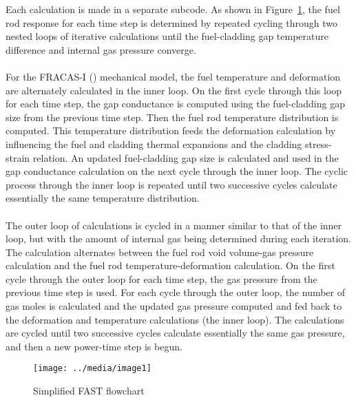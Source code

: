 Each calculation is made in a separate subcode. As shown in Figure~\ref{fig:fast-flowchart}, the
fuel rod response for each time step is determined by repeated cycling through two nested loops of
iterative calculations until the fuel-cladding gap temperature difference and internal gas pressure
converge.
\\
\\
For the FRACAS-I (\cite{ref:Bohn1977}) mechanical model, the fuel temperature and
deformation are alternately calculated in the inner loop. On the first cycle through this loop for
each time step, the gap conductance is computed using the fuel-cladding gap size from the previous
time step. Then the fuel rod temperature distribution is computed. This temperature distribution
feeds the deformation calculation by influencing the fuel and cladding thermal expansions and the
cladding stress-strain relation. An updated fuel-cladding gap size is calculated and used in the gap
conductance calculation on the next cycle through the inner loop. The cyclic process through the
inner loop is repeated until two successive cycles calculate essentially the same temperature
distribution.
\\
\\
The outer loop of calculations is cycled in a manner similar to that of the inner loop, but with the
amount of internal gas being determined during each iteration. The calculation alternates between
the fuel rod void volume-gas pressure calculation and the fuel rod temperature-deformation
calculation. On the first cycle through the outer loop for each time step, the gas pressure from the
previous time step is used. For each cycle through the outer loop, the number of gas moles is
calculated and the updated gas pressure computed and fed back to the deformation and temperature
calculations (the inner loop). The calculations are cycled until two successive cycles calculate
essentially the same gas pressure, and then a new power-time step is begun.

\begin{figure}
    \texttt{[image: ../media/image1]}
    \caption{Simplified FAST flowchart}
    \label{fig:fast-flowchart}
\end{figure}
